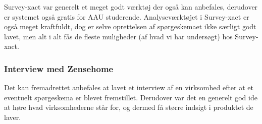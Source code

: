 Survey-xact var generelt et meget godt værktøj der også kan anbefales, derudover er systemet også gratis for AAU studerende. Analyseværktøjet i Survey-xact er også meget kraftfuldt, dog er selve oprettelsen af spørgeskemaet ikke særligt godt lavet, men alt i alt fås de fleste muligheder (af hvad vi har undersøgt) hos Survey-xact.\\

\subsubsection{Interview med Zensehome}
Det kan fremadrettet anbefales at lavet et interview af en virksomhed efter at et eventuelt spørgeskema er blevet fremstillet. Derudover var det en generelt god ide at høre hvad virksomhederne står for, og dermed få større indsigt i produktet de laver.


